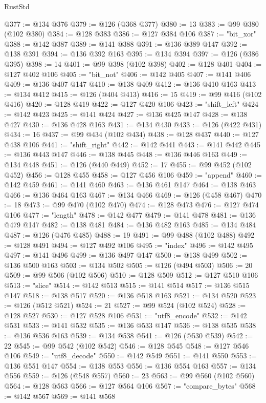 \begin{lexlean}{RustStd}
\begin{coremodule}
@377 := @134 @376
@379 := @126 (@368 @377)
@380 := 13
@383 := @99 @380 (@102 @380)
@384 := @128 @383
@386 := @127 @384 @106
@387 := "bit_xor"
@388 := @142 @387
@389 := @141 @388
@391 := @136 @389 @147
@392 := @138 @391
@394 := @136 @392 @163
@395 := @134 @394
@397 := @126 (@386 @395)
@398 := 14
@401 := @99 @398 (@102 @398)
@402 := @128 @401
@404 := @127 @402 @106
@405 := "bit_not"
@406 := @142 @405
@407 := @141 @406
@409 := @136 @407 @147
@410 := @138 @409
@412 := @136 @410 @163
@413 := @134 @412
@415 := @126 (@404 @413)
@416 := 15
@419 := @99 @416 (@102 @416)
@420 := @128 @419
@422 := @127 @420 @106
@423 := "shift_left"
@424 := @142 @423
@425 := @141 @424
@427 := @136 @425 @147
@428 := @138 @427
@430 := @136 @428 @163
@431 := @134 @430
@433 := @126 (@422 @431)
@434 := 16
@437 := @99 @434 (@102 @434)
@438 := @128 @437
@440 := @127 @438 @106
@441 := "shift_right"
@442 := @142 @441
@443 := @141 @442
@445 := @136 @443 @147
@446 := @138 @445
@448 := @136 @446 @163
@449 := @134 @448
@451 := @126 (@440 @449)
@452 := 17
@455 := @99 @452 (@102 @452)
@456 := @128 @455
@458 := @127 @456 @106
@459 := "append"
@460 := @142 @459
@461 := @141 @460
@463 := @136 @461 @147
@464 := @138 @463
@466 := @136 @464 @163
@467 := @134 @466
@469 := @126 (@458 @467)
@470 := 18
@473 := @99 @470 (@102 @470)
@474 := @128 @473
@476 := @127 @474 @106
@477 := "length"
@478 := @142 @477
@479 := @141 @478
@481 := @136 @479 @147
@482 := @138 @481
@484 := @136 @482 @163
@485 := @134 @484
@487 := @126 (@476 @485)
@488 := 19
@491 := @99 @488 (@102 @488)
@492 := @128 @491
@494 := @127 @492 @106
@495 := "index"
@496 := @142 @495
@497 := @141 @496
@499 := @136 @497 @147
@500 := @138 @499
@502 := @136 @500 @163
@503 := @134 @502
@505 := @126 (@494 @503)
@506 := 20
@509 := @99 @506 (@102 @506)
@510 := @128 @509
@512 := @127 @510 @106
@513 := "slice"
@514 := @142 @513
@515 := @141 @514
@517 := @136 @515 @147
@518 := @138 @517
@520 := @136 @518 @163
@521 := @134 @520
@523 := @126 (@512 @521)
@524 := 21
@527 := @99 @524 (@102 @524)
@528 := @128 @527
@530 := @127 @528 @106
@531 := "utf8_encode"
@532 := @142 @531
@533 := @141 @532
@535 := @136 @533 @147
@536 := @138 @535
@538 := @136 @536 @163
@539 := @134 @538
@541 := @126 (@530 @539)
@542 := 22
@545 := @99 @542 (@102 @542)
@546 := @128 @545
@548 := @127 @546 @106
@549 := "utf8_decode"
@550 := @142 @549
@551 := @141 @550
@553 := @136 @551 @147
@554 := @138 @553
@556 := @136 @554 @163
@557 := @134 @556
@559 := @126 (@548 @557)
@560 := 23
@563 := @99 @560 (@102 @560)
@564 := @128 @563
@566 := @127 @564 @106
@567 := "compare_bytes"
@568 := @142 @567
@569 := @141 @568

\end{coremodule}
\end{lexlean}

